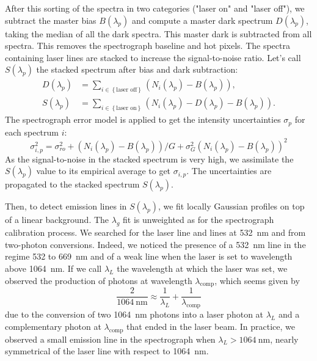 After this sorting of the spectra in two categories ("laser on" and "laser off"), we subtract the master bias $B(\lambda_p)$ and compute a master dark spectrum $D(\lambda_p)$, taking the median of all the dark spectra. This master dark is subtracted from all spectra. This removes the spectrograph baseline and hot pixels. The spectra containing laser lines are stacked to increase the signal-to-noise ratio. Let's call $S(\lambda_p)$ the stacked spectrum after bias and dark subtraction:
\begin{align}
D(\lambda_p) & = \sum_{i \in \left\lbrace \text{laser off}\right\rbrace}\left( N_i(\lambda_p) - B(\lambda_p)\right), \\
    S(\lambda_p) & = \sum_{i \in \left\lbrace \text{laser on}\right\rbrace}\left( N_i(\lambda_p) - D(\lambda_p) - B(\lambda_p)\right).
\end{align}
The spectrograph error model is applied to get the intensity uncertainties $\sigma_p$ for each spectrum $i$:
\begin{equation}\label{eq:spectro_error_model_data}
\sigma^2_{i,p} =\sigma_{ro}^2 +  (N_i(\lambda_p) - B(\lambda_p))/G + \sigma_G^2 (N_i(\lambda_p) - B(\lambda_p))^2
\end{equation}
As the signal-to-noise in the stacked spectrum is very high, we assimilate the $S(\lambda_p)$ value to its empirical average to get $\sigma_{i,p}$. The uncertainties are propagated to the stacked spectrum $S(\lambda_p)$.

Then, to detect emission lines in $S(\lambda_p)$, we fit locally Gaussian profiles on top of a linear background. The $\lambda_g$ fit is unweighted as for the spectrograph calibration process. We searched for the laser line and lines at \SI{532}{\nm} and from two-photon conversions. Indeed, we noticed the presence of a \SI{532}{\nm} line in the regime 532 to \SI{669}{\nm} and of a weak line when the laser is set to wavelength above \SI{1064}{\nm}. If we call $\lambda_L$ the wavelength at which the laser was set, we observed the production of photons at wavelength $\lambda_{\text{comp}}$, which seems given by
\begin{equation}
 \frac{2}{\SI{1064}{\nm}} \approx \frac{1}{\lambda_L} + \frac{1}{\lambda_{\text{comp}}}
 \end{equation} 
due to the conversion of two \SI{1064}{\nm} photons into a laser photon at $\lambda_L$ and a complementary photon at $\lambda_{\text{comp}}$ that ended in the laser beam. In practice, we observed a small emission line in the spectrograph when $\lambda_L > \SI{1064}{\nm}$, nearly symmetrical of the laser line with respect to \SI{1064}{\nm}. 

